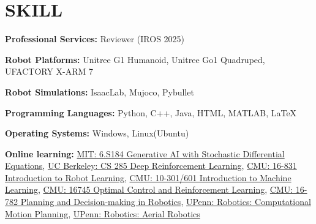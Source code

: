 \documentclass[a4paper,9pt]{extarticle}
\begin{document}
\section*{{\textbf{\fontsize{14pt}{8pt}\selectfont S}\textbf{\scshape KILL}}}
\textbf{Professional Services:} Reviewer (IROS 2025) 
\par\vspace{4pt}\noindent
\textbf{Robot Platforms:}{ Unitree
G1 Humanoid, Unitree Go1 Quadruped, UFACTORY X-ARM 7}
\par\vspace{4pt}\noindent
\textbf{Robot Simulations:}{ IsaacLab, Mujoco, Pybullet}
\par\vspace{4pt}\noindent
\textbf{Programming Languages:}{ Python, C++, Java, HTML, MATLAB, \LaTeX}
\par\vspace{4pt}\noindent
\textbf{Operating Systems:}{ Windows, Linux(Ubuntu)}
\par\vspace{4pt}\noindent
\textbf{Online learning:}{ \href{https://diffusion.csail.mit.edu/}{MIT: 6.S184 Generative AI with Stochastic Differential Equations}, \href{https://rail.eecs.berkeley.edu/deeprlcourse/}{UC Berkeley: CS 285 Deep Reinforcement Learning}, \href{https://16-831.github.io/spring25/}{CMU: 16-831 Introduction to Robot Learning}, \href{https://www.cs.cmu.edu/~mgormley/courses/10601-s23/schedule.html}{CMU: 10-301/601 Introduction to Machine Learning}, 
\href{https://optimalcontrol.ri.cmu.edu/}{CMU: 16745 Optimal Control and Reinforcement Learning}, \href{https://www.cs.cmu.edu/~maxim/classes/robotplanning_grad/}{CMU: 16-782 Planning and Decision-making in Robotics}, \href{https://www.coursera.org/account/accomplishments/verify/XVUC35BRMWXK}{UPenn: Robotics: Computational Motion Planning}, \href{https://www.coursera.org/account/accomplishments/verify/JUGYQI60Y5VO}{UPenn: Robotics: Aerial Robotics}}
\end{document}
